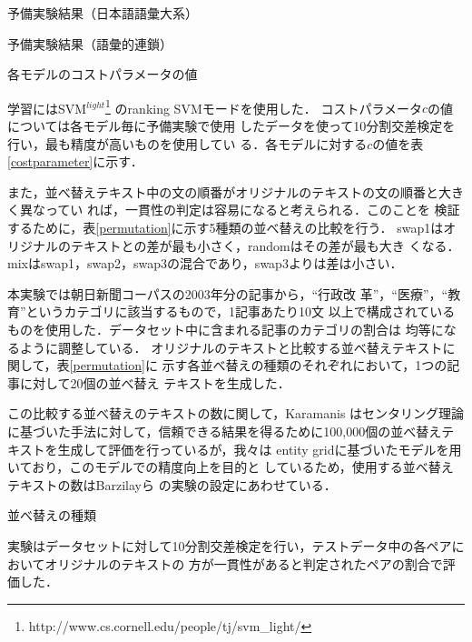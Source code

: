 \documentclass[japanese]{jnlp_1.4}
\begin{document}
 \begin{table}[b]
   \caption{予備実験結果（日本語語彙大系）}\label{goitaikeipilot}

 \end{table}
 \begin{table}[b]
   \caption{予備実験結果（語彙的連鎖）}\label{lcpilot}

 \end{table}
 \begin{table}[b]
   \caption{各モデルのコストパラメータの値}\label{costparameter}

 \end{table}


 学習にはSVM$^{light}$\footnote{http://www.cs.cornell.edu/people/tj/svm\_light/}
 のranking SVMモードを使用した．
 コストパラメータ$c$の値については各モデル毎に予備実験で使用
 したデータを使って10分割交差検定を行い，最も精度が高いものを使用してい
 る．各モデルに対する$c$の値を表\ref{costparameter}に示す．
 
 また，並べ替えテキスト中の文の順番がオリジナルのテキストの文の順番と大きく異なってい
 れば，一貫性の判定は容易になると考えられる．このことを
 検証するために，表\ref{permutation}に示す5種類の並べ替えの比較を行う．
 swap1はオリジナルのテキストとの差が最も小さく，randomはその差が最も大き
 くなる．mixはswap1，swap2，swap3の混合であり，swap3よりは差は小さい．

 本実験では朝日新聞コーパスの2003年分の記事から，``行政改
 革''，``医療''，``教育''というカテゴリに該当するもので，1記事あたり10文
 以上で構成されているものを使用した．データセット中に含まれる記事のカテゴリの割合は
 均等になるように調整している．
 オリジナルのテキストと比較する並べ替えテキストに関して，表\ref{permutation}に
 示す各並べ替えの種類のそれぞれにおいて，1つの記事に対して20個の並べ替え
 テキストを生成した．
 
 この比較する並べ替えのテキストの数に関して，Karamanis \cite{karamanis2006}はセンタリング理論
 に基づいた手法に対して，信頼できる結果を得るために100,000個の並べ替えテ
 キストを生成して評価を行っているが，我々は
 entity gridに基づいたモデルを用いており，このモデルでの精度向上を目的と
 しているため，使用する並べ替えテキストの数はBarzilayら
 \cite{barzilay2008}の実験の設定にあわせている．

 \begin{table}[b]
   \caption{並べ替えの種類}\label{permutation}

 \end{table}

 実験はデータセットに対して10分割交差検定を行い，テストデータ中の各ペアにおいてオリジナルのテキストの
 方が一貫性があると判定されたペアの割合で評価した．
 
\end{document}
